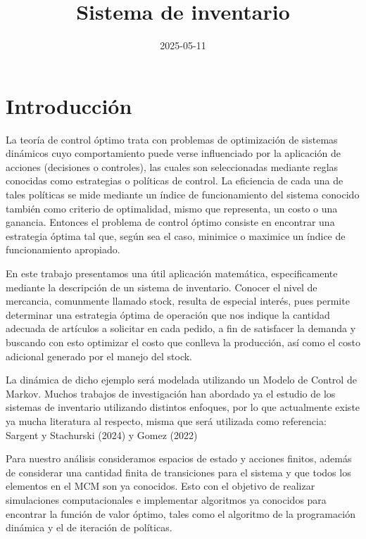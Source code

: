 \documentclass[
  us-letterpaper,
  DIV=11,
  numbers=noendperiod]{scrreprt}
\title{Sistema de inventario}
\author{}
\date{2025-05-11}
\renewcommand*\contentsname{Tabla de contenidos}
\newcommand\contentsname{Tabla de contenidos}
\begin{document}
\maketitle

\renewcommand*\contentsname{Tabla de contenidos}
{
\hypersetup{linkcolor=}
\setcounter{tocdepth}{2}
\tableofcontents
}


\chapter*{Introducción}\label{introducciuxf3n}


La teoría de control óptimo trata con problemas de optimización de
sistemas dinámicos cuyo comportamiento puede verse influenciado por la
aplicación de acciones (decisiones o controles), las cuales son
seleccionadas mediante reglas conocidas como estrategias o políticas de
control. La eficiencia de cada una de tales políticas se mide mediante
un índice de funcionamiento del sistema conocido también como criterio
de optimalidad, mismo que representa, un costo o una ganancia. Entonces
el problema de control óptimo consiste en encontrar una estrategia
óptima tal que, según sea el caso, minimice o maximice un índice de
funcionamiento apropiado.

En este trabajo presentamos una útil aplicación matemática,
especificamente mediante la descripción de un sistema de inventario.
Conocer el nivel de mercancia, comunmente llamado stock, resulta de
especial interés, pues permite determinar una estrategia óptima de
operación que nos indique la cantidad adecuada de artículos a solicitar
en cada pedido, a fin de satisfacer la demanda y buscando con esto
optimizar el costo que conlleva la producción, así como el costo
adicional generado por el manejo del stock.

La dinámica de dicho ejemplo será modelada utilizando un Modelo de
Control de Markov. Muchos trabajos de investigación han abordado ya el
estudio de los sistemas de inventario utilizando distintos enfoques, por
lo que actualmente existe ya mucha literatura al respecto, misma que
será utilizada como referencia: Sargent y Stachurski (2024) y Gomez
(2022)

Para nuestro análisis consideramos espacios de estado y acciones
finitos, además de considerar una cantidad finita de transiciones para
el sistema y que todos los elementos en el MCM son ya conocidos. Esto
con el objetivo de realizar simulaciones computacionales e implementar
algoritmos ya conocidos para encontrar la función de valor óptimo, tales
como el algoritmo de la programación dinámica y el de iteración de
políticas.
\end{document}
